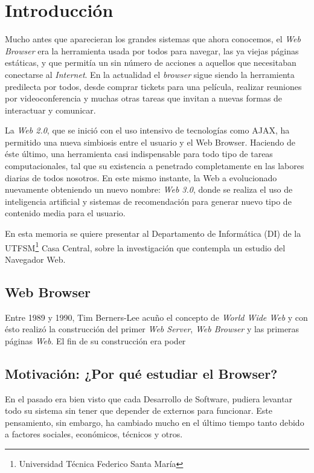 


\chapter{Introducción}
\label{chap:intro}

Mucho antes que aparecieran los grandes sistemas que ahora conocemos, el \textit{Web Browser} era la herramienta usada por todos para navegar, las ya viejas páginas estáticas, y que permitía un sin número de acciones a aquellos que necesitaban conectarse al \textit{Internet}. En la actualidad el \textit{browser} sigue siendo la herramienta predilecta por todos, desde comprar tickets para una película, realizar reuniones por videoconferencia y muchas otras tareas que invitan a nuevas formas de interactuar y comunicar.


La \textit{Web 2.0}, que se inició con el uso intensivo de tecnologías como AJAX, ha permitido una nueva simbiosis entre el usuario y el Web Browser. Haciendo de éste último, una herramienta casi indispensable para todo tipo de tareas computacionales, tal que su existencia a penetrado completamente en las labores diarias de todos nosotros. En este mismo instante, la Web a evolucionado nuevamente obteniendo un nuevo nombre: \textit{Web 3.0}, donde se realiza el uso de inteligencia artificial y sistemas de recomendación para generar nuevo tipo de contenido media para el usuario.


En esta memoria se quiere presentar al Departamento de Informática (DI) de la UTFSM\footnote{Universidad Técnica Federico Santa María} Casa Central, sobre la investigación que contempla un estudio del Navegador Web.

\section{Web Browser}
\label{chap:WB}
Entre 1989 y 1990, Tim Berners-Lee acuño el concepto de \textit{World Wide Web} y con ésto realizó la construcción del primer \textit{Web Server}, \textit{Web Browser }y las primeras páginas \textit{Web}. El fin de su construcción era poder

\section{Motivación: ¿Por qué estudiar el Browser?}
\label{chap:motiv}
En el pasado era bien visto que cada Desarrollo de Software, pudiera levantar todo su sistema sin tener que depender de externos para funcionar. Este pensamiento, sin embargo, ha cambiado mucho en el último tiempo tanto debido a factores sociales, económicos, técnicos y otros. 


